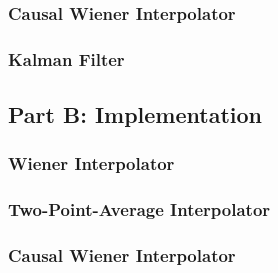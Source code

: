 \documentclass[11pt]{article}
\begin{document}
\subsubsection*{Causal Wiener Interpolator}
\label{subsubsec:causalwiener}



\subsubsection*{Kalman Filter}
\label{subsubsec:kalman}



\subsection*{Part B: Implementation}
\label{subsec:partB}


\subsubsection*{Wiener Interpolator}
\label{subsubsec:wienerimplementation}



\subsubsection*{Two-Point-Average Interpolator}
\label{subsubsec:avgimplementation}



\subsubsection*{Causal Wiener Interpolator}
\label{subsubsec:causalimplementation}


\end{document}

